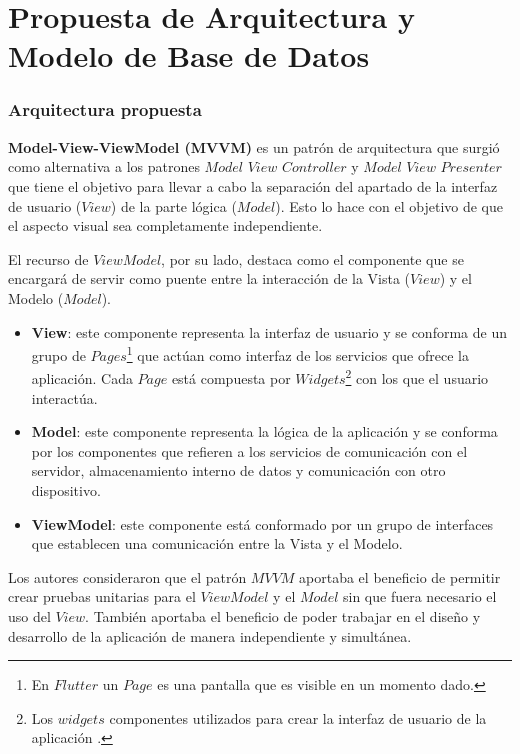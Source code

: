 
\chapter{Propuesta de Arquitectura y Modelo de Base de Datos}\label{chapter:implementation}

\subsection{Arquitectura propuesta}
\label{chapter:implementation}

\textbf{Model-View-ViewModel (MVVM)}  es un patrón de arquitectura que surgió como alternativa a los patrones $Model$ $View$ $Controller$ y $Model$ $View$ $Presenter$  que tiene el objetivo para llevar a cabo la separación del apartado de la interfaz de usuario ($View$) de la parte lógica ($Model$). Esto lo hace con el objetivo de que el aspecto visual sea completamente independiente.

El recurso de $ViewModel$, por su lado, destaca como el componente que se encargará de servir como puente entre la interacción de la Vista ($View$) y el Modelo ($Model$).

\begin{itemize}
\item \textbf{View}: este componente representa la interfaz de usuario y se conforma de un grupo de $Pages$\footnote{En $Flutter$ un $Page$ es una pantalla que es visible en un momento dado.} que actúan como interfaz de los servicios que ofrece la aplicación. Cada $Page$ está compuesta por $Widgets$\footnote{Los $widgets$ componentes utilizados para crear la interfaz de usuario de la aplicación .} con los que el usuario interactúa. 
\item \textbf{Model}: este componente representa la lógica de la aplicación y se conforma por los componentes que refieren a los servicios de comunicación con el servidor, almacenamiento interno de datos y comunicación con otro dispositivo.
\item \textbf{ViewModel}: este componente está conformado por un grupo de interfaces que establecen una comunicación entre la Vista y el Modelo.

\end{itemize}




Los autores consideraron que el patrón $MVVM$ aportaba el beneficio de permitir crear pruebas unitarias para el $ViewModel$ y el $Model$ sin que fuera necesario el uso del $View$. También aportaba el beneficio de poder trabajar en el diseño y desarrollo de la aplicación de manera independiente y simultánea.


